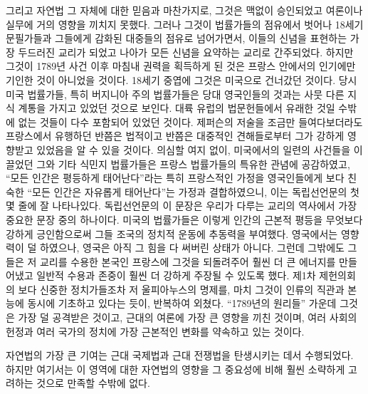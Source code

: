 그리고 자연법 그 자체에 대한 믿음과 마찬가지로,
그것은 맥없이 승인되었고 여론이나 실무에 거의 영향을 끼치지 못했다.
그러나 그것이
법률가들의 점유에서 벗어나 18세기 문필가들과
그들에게 감화된 대중들의 점유로 넘어가면서,
이들의 신념을 표현하는 가장 두드러진 교리가 되었고
나아가 모든 신념을 요약하는 교리로 간주되었다.
하지만 그것이 1789년 사건 이후 마침내 권력을 획득하게 된 것은
프랑스 안에서의 인기에만 기인한 것이 아니었을 것이다.
18세기 중엽에 그것은 미국으로 건너갔던 것이다.
당시 미국 법률가들, 특히 버지니아 주의 법률가들은
당대 영국인들의 것과는 사뭇 다른 지식 계통을 가지고 있었던 것으로 보인다.
대륙 유럽의 법문헌들에서 유래한 것일 수밖에 없는 것들이
다수 포함되어 있었던 것이다.
제퍼슨의 저술을 조금만 들여다보더라도
프랑스에서 유행하던 반쯤은 법적이고 반쯤은 대중적인 견해들로부터
그가 강하게 영향받고 있었음을 알 수 있을 것이다.
의심할 여지 없이, 미국에서의 일련의 사건들을 이끌었던
그와 기타 식민지 법률가들은
프랑스 법률가들의 특유한 관념에 공감하였고,
``모든 인간은 평등하게 태어난다''라는 특히 프랑스적인 가정을
영국인들에게 보다 친숙한 ``모든 인간은 자유롭게 태어난다''는 가정과
결합하였으니,
이는 독립선언문의 첫 몇 줄에 잘 나타나있다.
독립선언문의 이 문장은 우리가 다루는 교리의 역사에서
가장 중요한 문장 중의 하나이다.
미국의 법률가들은 이렇게 인간의 근본적 평등을 무엇보다 강하게 긍인함으로써
그들 조국의 정치적 운동에 추동력을 부여했다.
영국에서는 영향력이 덜 하였으나, 영국은 아직
그 힘을 다 써버린 상태가 아니다.
그런데 그밖에도 그들은 저 교리를 수용한 본국인 프랑스에 그것을 되돌려주어
훨씬 더 큰 에너지를 만들어냈고 일반적 수용과 존중이 훨씬 더 강하게
주장될 수 있도록 했다.
제1차 제헌의회의 보다 신중한 정치가들조차
저 울피아누스의 명제를,
마치 그것이 인류의 직관과 본능에 동시에 기초하고 있다는 듯이,
반복하여 외쳤다.
``1789년의 원리들'' 가운데 그것은 가장 덜 공격받은 것이고,
근대의 여론에 가장 큰 영향을 끼친 것이며,
여러 사회의 헌정과 여러 국가의 정치에 가장 근본적인 변화를
약속하고 있는 것이다.

자연법의 가장 큰 기여는 근대 국제법과 근대 전쟁법을 탄생시키는 데서 수행되었다.
하지만 여기서는 이 영역에 대한 자연법의 영향을
그 중요성에 비해 훨씬 소략하게 고려하는 것으로 만족할 수밖에 없다.

